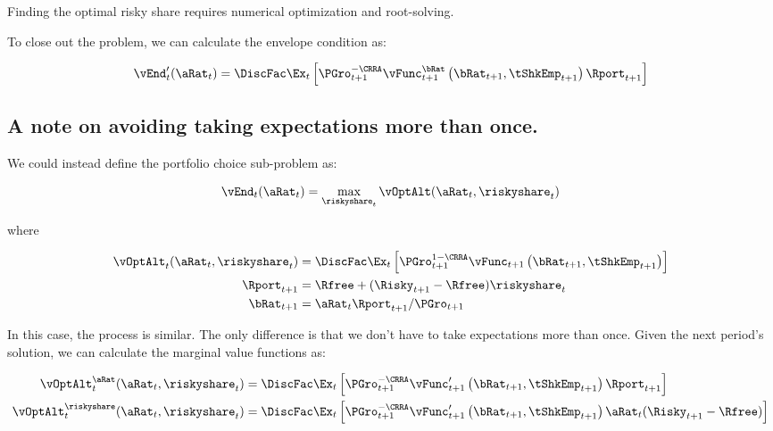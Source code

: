 \documentclass[\econtexRoot/EGMN]{subfiles}
\begin{document}
Finding the optimal risky share requires numerical optimization and root-solving.

To close out the problem, we can calculate the envelope condition as:

\begin{equation}
    \vEnd_{t}'(\aRat_{t}) = \DiscFac \Ex_{t} \left[ \PGro_{t+1}^{-\CRRA} \vFunc_{t+1}^{\bRat}\left(\bRat_{t+1}, \tShkEmp_{t+1}\right) \Rport_{t+1}  \right]
\end{equation}

\subsection{A note on avoiding taking expectations more than once.}

We could instead define the portfolio choice sub-problem as:

\begin{equation}
    \vEnd_{t}(\aRat_{t}) = \max_{\riskyshare_{t}} \vOptAlt(\aRat_{t}, \riskyshare_{t})
\end{equation}

where

\begin{equation}
    \begin{split}
        \vOptAlt_{t}(\aRat_{t}, \riskyshare_{t}) & = \DiscFac \Ex_{t} \left[ \PGro_{t+1}^{1-\CRRA} \vFunc_{t+1}\left(\bRat_{t+1}, \tShkEmp_{t+1}\right)   \right] \\
        \Rport_{t+1} & = \Rfree + (\Risky_{t+1} - \Rfree) \riskyshare_{t} \\
        \bRat_{t+1} & = \aRat_{t} \Rport_{t+1} / \PGro_{t+1}
    \end{split}
\end{equation}

In this case, the process is similar. The only difference is that we don't have to take expectations more than once. Given the next period's solution, we can calculate the marginal value functions as:

\begin{equation}
    \begin{split}
        \vOptAlt_{t}^{\aRat}(\aRat_{t}, \riskyshare_{t}) & = \DiscFac \Ex_{t} \left[ \PGro_{t+1}^{-\CRRA} \vFunc_{t+1}'\left(\bRat_{t+1}, \tShkEmp_{t+1}\right) \Rport_{t+1}   \right] \\
        \vOptAlt_{t}^{\riskyshare}(\aRat_{t}, \riskyshare_{t}) & = \DiscFac \Ex_{t} \left[ \PGro_{t+1}^{-\CRRA} \vFunc_{t+1}'\left(\bRat_{t+1}, \tShkEmp_{t+1}\right) \aRat_{t} (\Risky_{t+1} - \Rfree)   \right] \\
    \end{split}
\end{equation}
\end{document}
